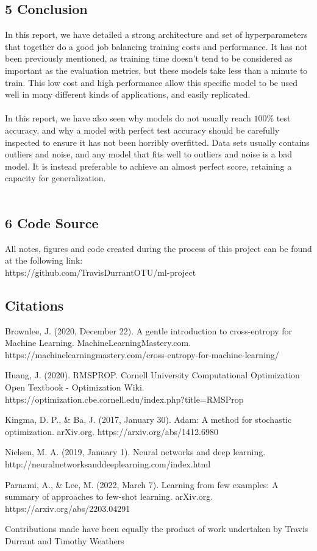 \documentclass{article}
\begin{document}
\subsection*{5 Conclusion}
In this report, we have detailed a strong architecture and set of hyperparameters that together do a good job balancing training costs and performance. It has not been previously mentioned, as training time doesn't tend to be considered as important as the evaluation metrics, but these models take less than a minute to train. This low cost and high performance allow this specific model to be used well in many different kinds of applications, and easily replicated.\\\\
In this report, we have also seen why models do not usually reach $100\%$ test accuracy, and why a model with perfect test accuracy should be carefully inspected to ensure it has not been horribly overfitted. Data sets usually contains outliers and noise, and any model that fits well to outliers and noise is a bad model. It is instead preferable to achieve an almost perfect score, retaining a capacity for generalization.\\\\
\subsection*{6 Code Source}
All notes, figures and code created during the process of this project can be found at the following link:\\
https://github.com/TravisDurrantOTU/ml-project
\pagebreak
\subsection*{Citations}
\begin{hangparas}{0.5 in}{1}
Brownlee, J. (2020, December 22). A gentle introduction to cross-entropy for Machine Learning. MachineLearningMastery.com. https://machinelearningmastery.com/cross-entropy-for-machine-learning/\newline

Huang, J. (2020). RMSPROP. Cornell University Computational Optimization Open Textbook - Optimization Wiki. https://optimization.cbe.cornell.edu/index.php?title=RMSProp \newline

Kingma, D. P., \& Ba, J. (2017, January 30). Adam: A method for stochastic optimization. arXiv.org. https://arxiv.org/abs/1412.6980\newline

Nielsen, M. A. (2019, January 1). Neural networks and deep learning. \newline http://neuralnetworksanddeeplearning.com/index.html\newline

Parnami, A., \& Lee, M. (2022, March 7). Learning from few examples: A summary of approaches to few-shot learning. arXiv.org. https://arxiv.org/abs/2203.04291\newline
\end{hangparas}
\pagebreak
Contributions made have been equally the product of work undertaken by Travis Durrant and Timothy Weathers
\end{document}
